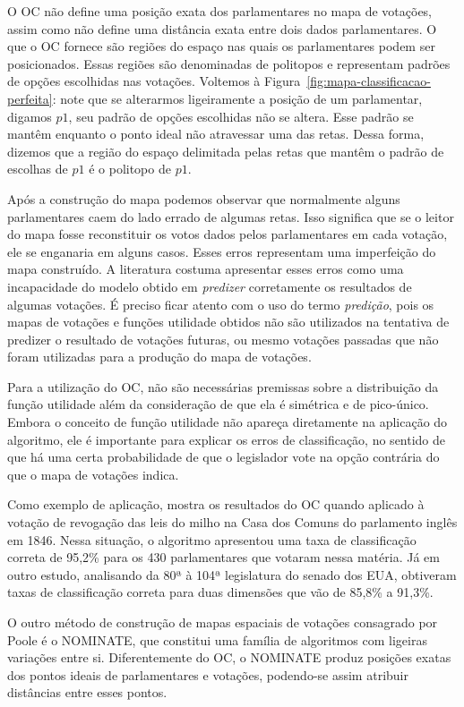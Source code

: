 \documentclass[
	article,			%
	12pt,				%
    twoside,			%
	a4paper,			%
	english,			%
	french,				%
	spanish,			%
	brazil,				%
	]{abntex2}
\newcommand\nominate{NOMINATE\xspace}
\begin{document}
O OC não define uma posição exata dos parlamentares no mapa de votações, assim como não define uma distância exata entre dois dados parlamentares. O que o OC fornece são regiões do espaço nas quais os parlamentares podem ser posicionados. Essas regiões são denominadas de politopos e representam padrões de opções escolhidas nas votações. Voltemos à Figura~\ref{fig:mapa-classificacao-perfeita}: note que se alterarmos ligeiramente a posição de um parlamentar, digamos $p1$, seu padrão de opções escolhidas não se altera. Esse padrão se mantêm enquanto o ponto ideal não atravessar uma das retas. Dessa forma, dizemos que a região do espaço delimitada pelas retas que mantêm o padrão de escolhas de $p1$ é o politopo de $p1$.

Após a construção do mapa podemos observar que normalmente alguns parlamentares caem do lado errado de algumas retas. Isso significa que se o leitor do mapa fosse reconstituir os votos dados pelos parlamentares em cada votação, ele se enganaria em alguns casos. Esses erros representam uma imperfeição do mapa construído. A literatura costuma apresentar esses erros como uma incapacidade do modelo obtido em \emph{predizer} corretamente os resultados de algumas votações. É preciso ficar atento com o uso do termo \emph{predição}, pois os mapas de votações e funções utilidade obtidos não são utilizados na tentativa de predizer o resultado de votações futuras, ou mesmo votações passadas que não foram utilizadas para a produção do mapa de votações. 

Para a utilização do OC, não são necessárias premissas sobre a distribuição da função utilidade além da consideração de que ela é simétrica e de pico-único. Embora o conceito de função utilidade não apareça diretamente na aplicação do algoritmo, ele é importante para explicar os erros de classificação, no sentido de que há uma certa probabilidade de que o legislador vote na opção contrária do que o mapa de votações indica.

Como exemplo de aplicação,  mostra os resultados do OC quando aplicado à votação de revogação das leis do milho na Casa dos Comuns do parlamento inglês em 1846. Nessa situação, o algoritmo apresentou uma taxa de classificação correta de 95,2\% para os 430 parlamentares que votaram nessa matéria. Já em outro estudo, analisando da 80ª à 104ª legislatura do senado dos EUA,  obtiveram taxas de classificação correta para duas dimensões que vão de 85,8\% a 91,3\%.

O outro método de construção de mapas espaciais de votações consagrado por Poole é o \nominate, que constitui uma família de algoritmos com ligeiras variações entre si. Diferentemente do OC, o \nominate produz posições exatas dos pontos ideais de parlamentares e votações, podendo-se assim atribuir distâncias entre esses pontos. 
\end{document}
